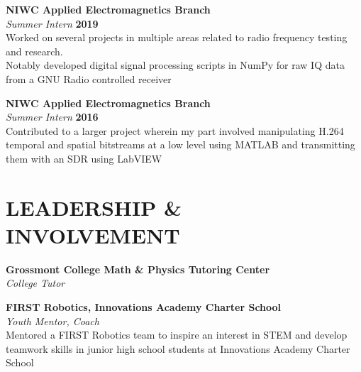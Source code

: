 \documentclass[margin,line]{resume}
\begin{document}
\begin{resume}
    \textbf{\listing NIWC Applied Electromagnetics Branch} \vspace{2mm}\\\vspace{1mm}%
    \textsl{Summer Intern} \hfill \textbf{2019}
    \\ Worked on several projects in multiple areas related to radio frequency testing and research. \\ Notably developed digital signal processing scripts in NumPy for raw IQ data from a GNU Radio controlled receiver

     \textbf{\listing NIWC Applied Electromagnetics Branch} \vspace{2mm}\\\vspace{1mm}%
    \textsl{Summer Intern} \hfill \textbf{2016}\\
    	Contributed to a larger project wherein my part involved manipulating H.264 temporal and spatial bitstreams at a low level using MATLAB and transmitting them with an SDR using LabVIEW


\sectionline

    \section{\mysidestyle \textbf{\large{L}\small{EADERSHIP \&} \\ \large{I}\small{NVOLVEMENT}}}



     \textbf{\listing Grossmont College Math \& Physics Tutoring Center} \vspace{2mm}\\\vspace{1mm}%
    \textsl{College Tutor} \hfill %


    	    \textbf{\listing FIRST Robotics, Innovations Academy Charter School} \vspace{2mm}\\\vspace{1mm}%
    \textsl{Youth Mentor, Coach} \hfill \textbf{}
    \\ Mentored a FIRST Robotics team to inspire an interest in STEM and develop teamwork skills in junior high school students at Innovations Academy Charter School



\end{resume}
\end{document}
